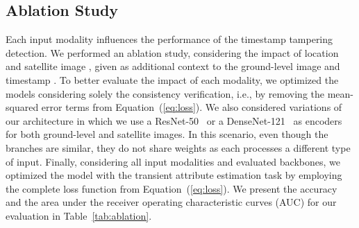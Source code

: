 \documentclass[journal]{IEEEtran}
\begin{document}
     
    
     
    \subsection{Ablation Study}\label{sec:exp_ablation}
    
        Each input modality influences the performance of the timestamp tampering detection. We performed an ablation study, considering the impact of location  and satellite image , given as additional context to the ground-level image  and timestamp . To better evaluate the impact of each modality, we optimized the models considering solely the consistency verification, i.e., by removing the mean-squared error terms from Equation~(\ref{eq:loss}). We also considered variations of our architecture in which we use a ResNet-50~\cite{he2016identity} or a DenseNet-121~\cite{huang2017densely} as encoders for both ground-level and satellite images. In this scenario, even though the branches are similar, they do not share weights as each processes a different type of input. Finally, considering all input modalities and evaluated backbones, we optimized the model with the transient attribute estimation task by employing the complete loss function from Equation~(\ref{eq:loss}). We present the accuracy and the area under the receiver operating characteristic curves (AUC) for our evaluation in Table~\ref{tab:ablation}.
        
        \begin{table}[!t]
            \centering
            \caption{Results for the ablation study of input modalities and visual encoder architectures.} 
            \label{tab:ablation}
        \end{table}
        
\end{document}
